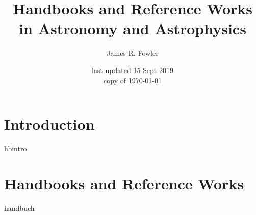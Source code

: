 \documentclass{article}
\begin{document}
\title{Handbooks and Reference Works in Astronomy and Astrophysics}
\author{James R. Fowler}
\date{last updated 15 Sept 2019\\ copy of \today}

\maketitle

\tableofcontents
\listoftables


\section{Introduction}
{hbintro}

\section{Handbooks and Reference Works}
{handbuch}
\end{document}
